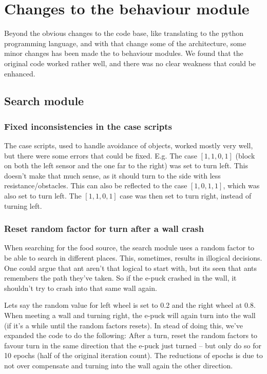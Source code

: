\section{Changes to the behaviour module}

Beyond the obvious changes to the code base, like translating to the python programming language, and with that change some of the architecture, some minor changes has been made the to behaviour modules. We found that the original code worked rather well, and there was no clear weakness that could be enhanced. 

\subsection{Search module}

\subsubsection{Fixed inconsistencies in the case scripts}
The case scripts, used to handle avoidance of objects, worked mostly very well, but there were some errors that could be fixed. E.g. The case $[1, 1, 0, 1]$ (block on both the left sensor and the one far to the right) was set to turn left. This doesn't make that much sense, as it should turn to the side with less resistance/obstacles. This can also be reflected to the case $[1, 0, 1, 1]$, which was also set to turn left. The $[1, 1, 0, 1]$ case was then set to turn right, instead of turning left. 

\subsubsection{Reset random factor for turn after a wall crash}
When searching for the food source, the search module uses a random factor to be able to search in different places. This, sometimes, results in illogical decisions. One could argue that ant aren't that logical to start with, but its seen that ants remembers the path they've taken. So if the e-puck crashed in the wall, it shouldn't try to crash into that same wall again. 


Lets say the random value for left wheel is set to 0.2 and the right wheel at 0.8. When meeting a wall and turning right, the e-puck will again turn into the wall (if it's a while until the random factors resets). In stead of doing this, we've expanded the code to do the following: After a turn, reset the random factors to favour turn in the same direction that the e-puck just turned – but only do so for 10 epochs (half of the original iteration count). The reductions of epochs is due to not over compensate and turning into the wall again the other direction. 

